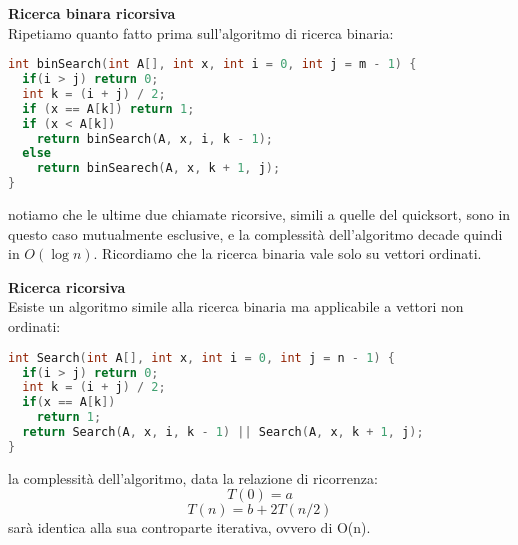 \documentclass[a4paper,12pt]{article}
\begin{document}
\textbf{Ricerca binara ricorsiva} \\
Ripetiamo quanto fatto prima sull'algoritmo di ricerca binaria:
\begin{lstlisting}[language=C++]
int binSearch(int A[], int x, int i = 0, int j = m - 1) {
  if(i > j) return 0;
  int k = (i + j) / 2;
  if (x == A[k]) return 1;
  if (x < A[k])
    return binSearch(A, x, i, k - 1);
  else
    return binSearech(A, x, k + 1, j);
}
\end{lstlisting}
notiamo che le ultime due chiamate ricorsive, simili a quelle del quicksort, sono in questo caso mutualmente
esclusive, e la complessità dell'algoritmo decade quindi in $O(\log{n})$. Ricordiamo che la ricerca binaria
vale solo su vettori ordinati.

\textbf{Ricerca ricorsiva} \\
Esiste un algoritmo simile alla ricerca binaria ma applicabile a vettori non ordinati:
\begin{lstlisting}[language=C++]
int Search(int A[], int x, int i = 0, int j = n - 1) {
  if(i > j) return 0;
  int k = (i + j) / 2;
  if(x == A[k])
    return 1;
  return Search(A, x, i, k - 1) || Search(A, x, k + 1, j);
}
\end{lstlisting}
la complessità dell'algoritmo, data la relazione di ricorrenza:
$$ T(0) = a $$
$$ T(n) = b + 2T(n / 2) $$
sarà identica alla sua controparte iterativa, ovvero di O(n).
\end{document}
